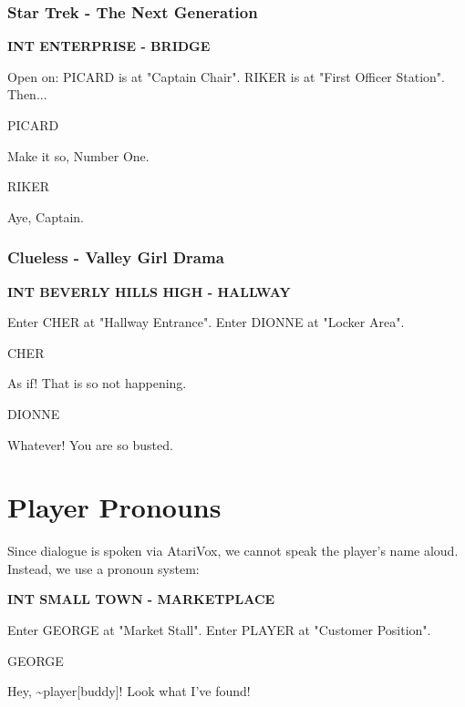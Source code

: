 \documentclass[11pt,letterpaper,oldstylefigures]{memoir}
\newcommand{\slugline}[1]{\nobreak\textbf{\MakeUppercase{#1}}\par\nobreak\vspace{1\baselineskip}}
\newcommand{\speaker}[1]{\nobreak\hspace*{0.333\textwidth}\MakeUppercase{#1}\par\nobreak\vspace{0.5\baselineskip}}
\newcommand{\dialogue}[1]{\nobreak\hspace*{0.25\textwidth}\begin{minipage}{0.5\textwidth}#1\end{minipage}\par\vspace{1\baselineskip}}
\newcommand{\stagedir}[1]{#1\par\vspace{1\baselineskip}}
\newenvironment{FountainExample}
  {\begingroup
  \ttfamily\small
   \setlength{\parindent}{0pt}
  \setlength{\parskip}{0.5em}
  \allowdisplaybreaks
  \setlength{\displaywidowpenalty}{0}
  \setlength{\widowpenalty}{0}
  \setlength{\clubpenalty}{0}
  \setlength{\interlinepenalty}{0}
}
  {\endgroup}
\newcommand{\paragraphbreak}{\vspace{0.5em}}
\begin{document}
\paragraphbreak

\subsubsection*{Star Trek - The Next Generation}
\label{ex:star-trek-the-next-generation-2}

\begin{FountainExample}
\slugline{INT ENTERPRISE - BRIDGE}

\stagedir{Open on: PICARD is at "Captain Chair". RIKER is at "First Officer Station". Then...}

\speaker{PICARD}
\dialogue{Make it so, Number One.}

\speaker{RIKER}
\dialogue{Aye, Captain.}
\end{FountainExample}

\paragraphbreak

\subsubsection*{Clueless - Valley Girl Drama}
\label{ex:clueless-valley-girl-drama-2}

\begin{FountainExample}
\slugline{INT BEVERLY HILLS HIGH - HALLWAY}

\stagedir{Enter CHER at "Hallway Entrance". Enter DIONNE at "Locker Area".}

\speaker{CHER}
\dialogue{As if! That is so not happening.}

\speaker{DIONNE}
\dialogue{Whatever! You are so busted.}
\end{FountainExample}

\section{Player Pronouns}
\paragraphbreak

Since dialogue is spoken via AtariVox, we cannot speak the player's name aloud. Instead, we use a pronoun system:

\begin{FountainExample}
\slugline{INT SMALL TOWN - MARKETPLACE}

\stagedir{Enter GEORGE at "Market Stall". Enter PLAYER at "Customer Position".}

\speaker{GEORGE}
\dialogue{Hey, \textasciitilde{}player[buddy]! Look what I've found!}
\end{FountainExample}
\end{document}
